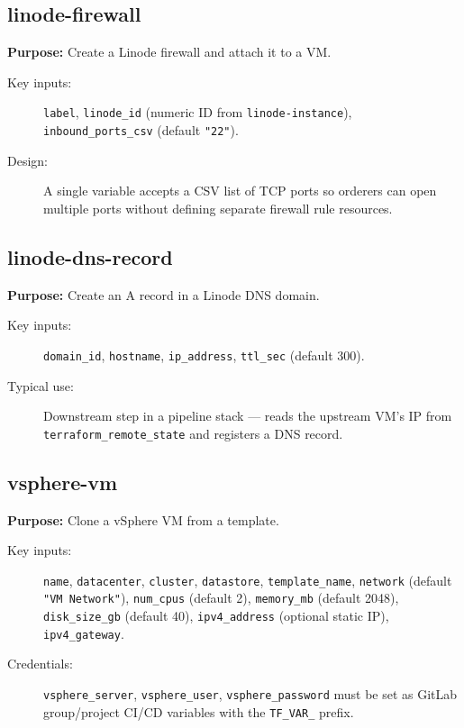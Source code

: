 \documentclass[12pt,a4paper,twoside]{report}
\newcommand{\code}[1]{\texttt{#1}}
\begin{document}
\subsection{linode-firewall}

\textbf{Purpose:} Create a Linode firewall and attach it to a VM.

\begin{description}
  \item[Key inputs:]
    \code{label}, \code{linode\_id} (numeric ID from
    \code{linode-instance}), \code{inbound\_ports\_csv}
    (default \code{"22"}).
  \item[Design:]
    A single variable accepts a CSV list of TCP ports so orderers can
    open multiple ports without defining separate firewall rule
    resources.
\end{description}

\subsection{linode-dns-record}

\textbf{Purpose:} Create an A record in a Linode DNS domain.

\begin{description}
  \item[Key inputs:]
    \code{domain\_id}, \code{hostname}, \code{ip\_address},
    \code{ttl\_sec} (default 300).
  \item[Typical use:]
    Downstream step in a pipeline stack — reads the upstream VM's IP
    from \code{terraform\_remote\_state} and registers a DNS record.
\end{description}

\subsection{vsphere-vm}

\textbf{Purpose:} Clone a vSphere VM from a template.

\begin{description}
  \item[Key inputs:]
    \code{name}, \code{datacenter}, \code{cluster}, \code{datastore},
    \code{template\_name}, \code{network} (default \code{"VM Network"}),
    \code{num\_cpus} (default 2), \code{memory\_mb} (default 2048),
    \code{disk\_size\_gb} (default 40), \code{ipv4\_address} (optional
    static IP), \code{ipv4\_gateway}.
  \item[Credentials:]
    \code{vsphere\_server}, \code{vsphere\_user},
    \code{vsphere\_password} must be set as GitLab group/project
    CI/CD variables with the \code{TF\_VAR\_} prefix.
\end{description}
\end{document}
